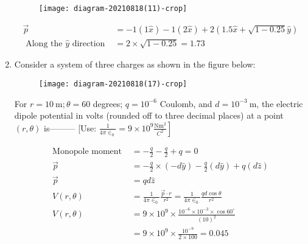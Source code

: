 \begin{enumerate}
\begin{figure}[H]
\centering
\texttt{[image: diagram-20210818(11)-crop]}
\end{figure}
\begin{answer}
\begin{align*}
\vec{p}&=-1(1 \hat{x})-1(2 \hat{x})+2(1.5 \hat{x}+\sqrt{1-0.25} \hat{y})\\
\text{	Along the }\hat{y}\text{ direction }&=2 \times \sqrt{1-0.25}=1.73
\end{align*}
\end{answer}
	\item Consider a system of three charges as shown in the figure below:\\
\begin{figure}[H]
	\centering
	\texttt{[image: diagram-20210818(17)-crop]}
\end{figure}
 For $r=10 \mathrm{~m} ; \theta=60$ degrees; $q=10^{-6}$ Coulomb, and $d=10^{-3} \mathrm{~m}$, the electric dipole potential in volts (rounded off to three decimal places) at a point $(r, \theta)$ is--------- [Use: $\left.\frac{1}{4 \pi \in_{0}}=9 \times 10^{9} \frac{\mathrm{Nm}^{2}}{C^{2}}\right]$
{}

\begin{answer}
\begin{align*}
\text{Monopole moment }&=-\frac{q}{2}-\frac{q}{2}+q=0\\
\vec{p}&=-\frac{q}{2} \times(-d \hat{y})-\frac{q}{2}(d \hat{y})+q(d \hat{z})\\
\vec{p}&=q d \hat{z}\\
V(r, \theta)&=\frac{1}{4 \pi \in_{0}} \frac{\vec{p} \cdot r}{r^{2}}=\frac{1}{4 \pi \in_{0}} \frac{q d \cos \theta}{r^{2}}\\
V(r, \theta)&=9 \times 10^{9} \times \frac{10^{-6} \times 10^{-3} \times \cos 60^{\circ}}{(10)^{2}}\\
&=9 \times 10^{9} \times \frac{10^{-9}}{2 \times 100}=0.045
\end{align*}
\end{answer}
\end{enumerate}
\setlength\arrayrulewidth{1pt}
